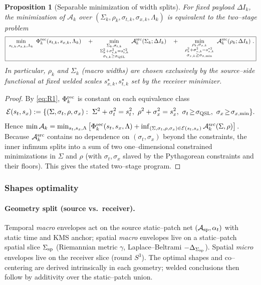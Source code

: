 \documentclass[10pt]{article}
\theoremstyle{definition}
\theoremstyle{plain}
\newtheorem{proposition}{Proposition}[section]
\begin{document}
\begin{proposition}[Separable minimization of width splits]\label{prop:separable}
For fixed payload \(\Delta I_k\), the minimization of \(\mathcal A_k\) over
\((\Sigma_k,\rho_k,\sigma_{t,k},\sigma_{x,k},\Lambda_k)\) is equivalent to the two–stage problem
\[
\boxed{\ 
\min_{s_{t,k},s_{x,k},\Lambda_k}\ \Phi^{\rm rec}_k(s_{t,k},s_{x,k},\Lambda_k)
\quad+\quad
\min_{\substack{\Sigma_k,\sigma_{t,k}\\ \Sigma_k^2+\sigma_{t,k}^2=s_{t,k}^{\star 2}\\ \sigma_{t,k}\ge\sigma_{\rm QSL}}}\ \mathcal A^{\rm src}_k(\Sigma_k;\Delta I_k)
\quad+\quad
\min_{\substack{\rho_k,\sigma_{x,k}\\ \rho_k^2+\sigma_{x,k}^2=s_{x,k}^{\star 2}\\ \sigma_{x,k}\ge\sigma_{x,{\rm min}}}}\ \mathcal A^{\rm src}_k(\rho_k;\Delta I_k)\ .
}
\]
In particular, \(\rho_k\) and \(\Sigma_k\) (macro widths) are chosen \emph{exclusively} by the source–side functional at fixed welded scales \(s_{x,k}^\star,s_{t,k}^\star\) set by the receiver minimizer.
\end{proposition}

\begin{proof}
By \eqref{eq:R1}, \(\Phi^{\rm rec}_k\) is constant on each equivalence class
\[
\mathcal E(s_t,s_x):=\{(\Sigma,\sigma_t,\rho,\sigma_x):\ \Sigma^2+\sigma_t^2=s_t^2,\ \rho^2+\sigma_x^2=s_x^2,\ \sigma_t\!\ge\!\sigma_{\rm QSL},\ \sigma_x\!\ge\!\sigma_{x,{\rm min}}\}.
\]
Hence \(\min\mathcal A_k = \min_{s_t,s_x,\Lambda} \left[\Phi^{\rm rec}_k(s_t,s_x,\Lambda)+ \inf_{(\Sigma,\sigma_t,\rho,\sigma_x)\in\mathcal E(s_t,s_x)} \mathcal A^{\rm src}_k(\Sigma,\rho)\right]\).
Because \(\mathcal A^{\rm src}_k\) contains no dependence on \((\sigma_t,\sigma_x)\) beyond the constraints, the inner infimum splits into a sum of two one–dimensional constrained minimizations in \(\Sigma\) and \(\rho\) (with \(\sigma_t,\sigma_x\) slaved by the Pythagorean constraints and their floors). This gives the stated two–stage program. 
\end{proof}

\subsubsection*{Shapes optimality}
\label{subsubsec:shapes-optimality}

\paragraph{Geometry split (source vs.\ receiver).}\label{par:uom-main-058}
Temporal \emph{macro} envelopes act on the source static–patch net $(\mathcal A_{\rm sp},\alpha_t)$
with static time and KMS anchor; spatial \emph{macro} envelopes live on a static–patch spatial
slice $\Sigma_{\rm sp}$ (Riemannian metric $\gamma$, Laplace–Beltrami $-\Delta_{\Sigma_{\rm sp}}$).
Spatial \emph{micro} envelopes live on the receiver slice (round $S^3$). The optimal shapes and
co–centering are derived intrinsically in each geometry; welded conclusions then follow by additivity
over the static–patch union.
\end{document}
